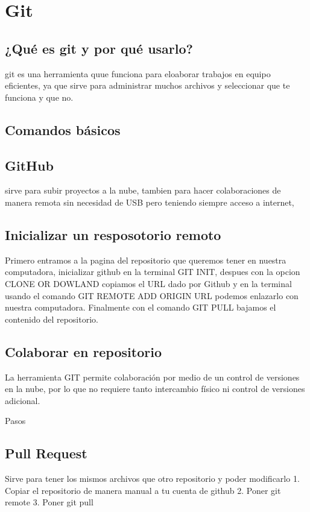 \documentclass[11pt,letterpaper]{article}
\begin{document}
\section{Git}
\subsection{¿Qué es git y por qué usarlo?}
git es una herramienta quue funciona para eloaborar trabajos en equipo eficientes, ya que sirve para administrar muchos archivos y seleccionar que te funciona y que no.
\subsection{Comandos básicos}

\subsection{GitHub}
 sirve para subir proyectos a la nube, tambien para hacer colaboraciones de manera remota sin necesidad de USB pero teniendo siempre  acceso a internet,
\subsection{Inicializar un resposotorio remoto}

Primero entramos a la pagina del repositorio que queremos tener en nuestra computadora, inicializar github en la terminal GIT INIT, despues con la opcion CLONE OR DOWLAND copiamos el URL dado por Github y en la terminal usando el comando GIT REMOTE ADD ORIGIN URL podemos enlazarlo con nuestra computadora. Finalmente con el comando GIT PULL bajamos el contenido del repositorio.

\subsection{Colaborar en repositorio}
La herramienta GIT permite colaboración por medio de un control de versiones en la nube, por lo que no requiere tanto intercambio físico ni control de versiones adicional.

Pasos

\subsection{Pull Request}
Sirve para tener los mismos archivos que otro repositorio y poder modificarlo
1. Copiar el repositorio de manera manual a tu cuenta de github
2. Poner git remote
3. Poner git pull
\end{document}
